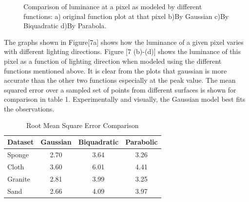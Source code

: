 \begin{figure}[t]
{\label{fig:subfig3}
}
\caption{Comparison of luminance
 at a pixel as modeled by different functions: a) original
function plot at that pixel b)By Gaussian c)By Biquadratic
d)By Parabola.}  \label{fig:subfigureExample}
\end{figure}


The graphs shown in Figure[7a] shows how the luminance of a given pixel varies
with different lighting directions. Figure [7 (b)-(d)] shows the luminance of
this pixel as a function of lighting direction when modeled using the different
functions mentioned above. It is clear from the plots that gaussian is more
accurate than the other two functions especially at the peak value. The mean
squared error over a sampled set of points from different surfaces is shown for
comparison in table 1. Experimentally and visually, the Gaussian model best fits
the observations.

\begin{table}[ht]
\centering
 \caption{Root Mean Square Error Comparison}
  \begin{tabular}{| l | c | c | c |}
    \hline
    Dataset & Gaussian & Biquadratic & Parabolic\\ \hline
    Sponge & 2.70 & 3.64 & 3.26\\ \hline
    Cloth &  3.60 & 6.01 & 4.41\\ \hline
    Granite & 2.81 & 3.99 & 3.25\\ \hline
    Sand & 2.66 & 4.09 & 3.97\\ \hline
  \end{tabular}
\end{table}

